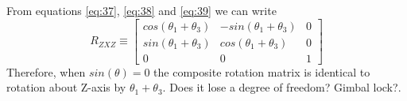 \documentclass[12pt]{article}
\newcommand{\rz}[1]{\begin{bmatrix} cos(#1) & -sin(#1) & 0 \\ sin(#1) & cos(#1) & 0 \\ 0 & 0 & 1 \end{bmatrix}}
\begin{document}
From equations \ref{eq:37}, \ref{eq:38} and \ref{eq:39} we can write
\begin{equation}
  \label{eq:310}
  R_{ZXZ} \equiv \rz{\theta_1 + \theta_3}
\end{equation}
Therefore, when $sin(\theta) = 0$ the composite rotation matrix is identical to rotation about Z-axis by $ \theta_1 + \theta_3 $.
{\color{red} Does it lose a degree of freedom? Gimbal lock?}.
\end{document}

